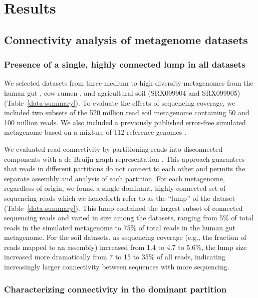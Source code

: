 \documentclass[10pt]{article}
\begin{document}
\section*{Results}

\subsection*{Connectivity analysis of metagenome datasets}

\subsubsection*{Presence of a single, highly connected lump in all datasets}
We selected datasets from three medium to high diversity
metagenomes from the human gut \cite{Qin:2010p189}, cow rumen
\cite{Hess:2011p686}, and agricultural soil (SRX099904 and SRX099905)
(Table~\ref{data-summary}).  To
evaluate the effects of sequencing coverage, we included two subsets
of the 520 million read soil metagenome containing 50 and 100 million
reads.  We also included a previously published error-free simulated
metagenome based on a mixture of 112 reference genomes
\cite{Pignatelli:2011p742}.

We evaluated read connectivity by partitioning reads into disconnected
components with a de Bruijn graph representation \cite{Pell:2012cq}.  This approach
guarantees that reads in different partitions do not connect to each
other and permits the separate assembly and analysis of each
partition.  For each metagenome, regardless of origin, we found a
single dominant, highly connected set of sequencing reads which we
henceforth refer to as the ``lump'' of the dataset (Table~\ref{data-summary}).  This lump contained the largest subset of connected sequencing
reads and varied in size among the datasets, ranging from 5\% of total
reads in the simulated metagenome to 75\% of total reads in the human
gut metagenome.  For the soil datasets, as sequencing coverage (e.g.,
the fraction of reads mapped to an assembly) increased from 1.4 to 4.7
to 5.6\%, the lump size increased more dramatically from 7 to 15 to
35\% of all reads, indicating increasingly larger connectivity between
sequences with more sequencing.

\subsubsection*{Characterizing connectivity in the dominant partition}
\end{document}
